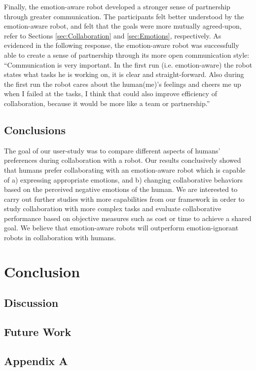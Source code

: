 \documentclass[12pt]{report}
\begin{document}
Finally, the emotion-aware robot developed a stronger sense of  partnership
through greater communication. The participants felt better understood by the
emotion-aware robot, and felt that the goals were more mutually agreed-upon,
refer to Sections \ref{sec:Collaboration} and \ref{sec:Emotions}, respectively. As
evidenced in the following response, the emotion-aware robot was successfully
able to create a sense of partnership through its more open communication style:
``Communication is very important. In the first run (i.e. emotion-aware) the
robot states what tasks he is working on, it is clear and straight-forward. Also
during the first run the robot cares about the human(me)'s feelings and cheers
me up when I failed at the tasks, I think that could also improve efficiency of
collaboration, because it would be more like a team or partnership.''

\section{Conclusions}
The goal of our user-study was to compare different aspects of humans'
preferences during collaboration with a robot. Our results conclusively showed
that humans prefer collaborating with an emotion-aware robot which is capable
of a) expressing appropriate emotions, and b) changing collaborative behaviors
based on the perceived negative emotions of the human. We are interested to
carry out further studies with more capabilities from our framework in order to
study collaboration with more complex tasks and evaluate collaborative
performance based on objective measures such as cost or time to achieve a shared
goal. We believe that emotion-aware robots will outperform emotion-ignorant
robots in collaboration with humans.

\chapter{Conclusion}
\label{ch:conclusion}

\section{Discussion}

\section{Future Work}

\pagebreak





\begin{appendices}
\chapter*{Appendix A}
\label{apdx:constraints}

\end{appendices}
\end{document}
